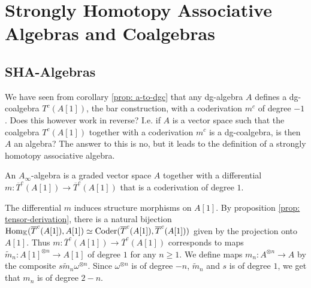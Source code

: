 \documentclass[../thesis.tex]{subfiles}
\begin{document}

    \section{Strongly Homotopy Associative Algebras and Coalgebras}\label{sec: 1.3}
    \subsection{SHA-Algebras}
        We have seen from corollary \ref{prop: a-to-dgc} that any dg-algebra $A$ defines a dg-coalgebra $T^c(A[1])$, the bar construction, with a coderivation $m^c$ of degree $-1$. Does this however work in reverse? I.e. if $A$ is a vector space such that the coalgebra $T^c(A[1])$ together with a coderivation $m^c$ is a dg-coalgebra, is then $A$ an algebra? The answer to this is no, but it leads to the definition of a strongly homotopy associative algebra.

        \begin{definition}
            An $A_\infty$-algebra is a graded vector space $A$ together with a differential $m:\overline{T}^c(A[1])\rightarrow\overline{T}^c(A[1])$ that is a coderivation of degree $1$.
        \end{definition}

        The differential $m$ induces structure morphisms on $A[1]$. By proposition \ref{prop: tensor-derivation}, there is a natural bijection $\tt{Hom}_\mathbb{K}(\overline{T}^c(A[1]),A[1])\simeq \tt{Coder}(\overline{T}^c(A[1]),\overline{T}^c(A[1]))$ given by the projection onto $A[1]$. Thus $m:\overline{T}^c(A[1])\rightarrow\overline{T}^c(A[1])$ corresponds to maps $\widetilde{m}_n:A[1]^{\otimes n}\rightarrow A[1]$ of degree $1$ for any $n\geq 1$. We define maps $m_n : A^{\otimes n}\rightarrow A$ by the composite $s\widetilde{m}_n \omega^{\otimes n}$. Since $\omega^{\otimes n}$ is of degree $-n$, $\widetilde{m}_n$ and $s$ is of degree $1$, we get that $m_n$ is of degree $2-n$.
        \begin{center}
        \end{center}
\end{document}
